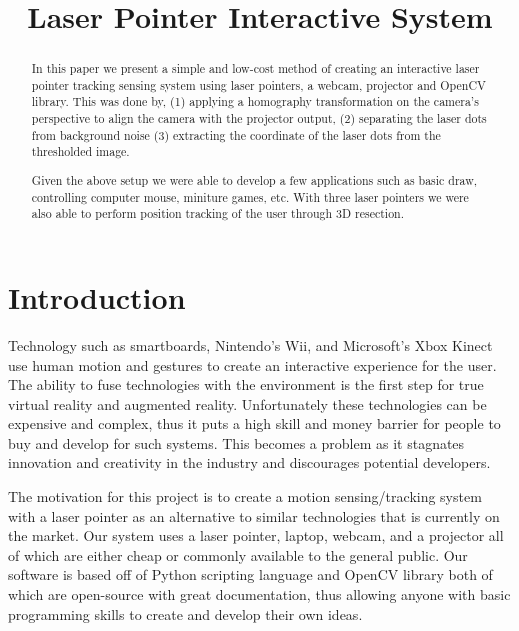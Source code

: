 \documentclass[a4paper]{article}
\begin{document}
\ninept

\title{Laser Pointer Interactive System}

\makeatletter
\def\name#1{\gdef\@name{#1\\}}

\makeatother 
\name{\em Alex Taffe, Kan Kawabata, Vincent Velarde}
\address{School of Electrical, Computer and Energy Engineering}
	
\maketitle
\begin{abstract}
	In this paper we present a simple and low-cost method of creating an interactive laser pointer tracking sensing system using laser pointers, a webcam, projector and OpenCV library. This was done by, (1) applying a homography transformation on the camera's perspective to align the camera with the projector output, (2) separating the laser dots from background noise (3) extracting the coordinate of the laser dots from the thresholded image. 
	
	Given the above setup we were able to develop a few applications such as basic draw, controlling computer mouse, miniture games, etc. With three laser pointers we were also able to perform position tracking of the user through 3D resection.
	
\end{abstract}

\section{Introduction}
Technology such as smartboards, Nintendo's Wii, and Microsoft's Xbox Kinect use human motion and gestures to create an interactive experience for the user. The ability to fuse technologies with the environment is the first step for true virtual reality and augmented reality. Unfortunately these technologies can be expensive and complex, thus it puts a high skill and money barrier for people to buy and develop for such systems. This becomes a problem as it stagnates innovation and creativity in the industry and discourages potential developers. 
 
The motivation for this project is to create a motion sensing/tracking system with a laser pointer as an alternative to similar technologies that is currently on the market. Our system uses a laser pointer, laptop, webcam, and a projector all of which are either cheap or commonly available to the general public. Our software is based off of Python scripting language and OpenCV library both of which are open-source with great documentation, thus allowing anyone with basic programming skills to create and develop their own ideas. 
\end{document}
